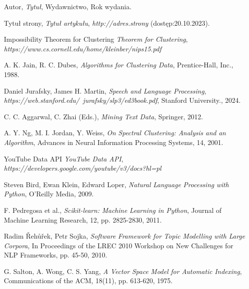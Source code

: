 \begin{thebibliography}{9}
\small


Autor, \emph{Tytuł}, Wydawnictwo, Rok wydania.

Tytuł strony, \emph{Tytuł artykułu}, \emph{http://adres.strony} (dostęp:20.10.2023).


Impossibility Theorem for Clustering
\emph{Theorem for Clustering}, \emph{https://www.cs.cornell.edu/home/kleinber/nips15.pdf}

A. K. Jain, R. C. Dubes, \emph{Algorithms for Clustering Data}, Prentice-Hall, Inc., 1988.

Daniel Jurafsky, James H. Martin, 
\emph{Speech and Language Processing}, \emph{https://web.stanford.edu/~jurafsky/slp3/ed3book.pdf},
Stanford University., 2024.

C. C. Aggarwal, C. Zhai (Eds.), \emph{Mining Text Data}, Springer, 2012.

A. Y. Ng, M. I. Jordan, Y. Weiss, \emph{On Spectral Clustering: Analysis and an Algorithm}, Advances in Neural Information Processing Systems, 14, 2001.


YouTube Data API \emph{YouTube Data API}, \emph{https://developers.google.com/youtube/v3/docs?hl=pl}

Steven Bird, Ewan Klein, Edward Loper, \emph{Natural Language Processing with Python}, O'Reilly Media, 2009.

F. Pedregosa et al., \emph{Scikit-learn: Machine Learning in Python}, Journal of Machine Learning Research, 12, pp. 2825-2830, 2011.

Radim Řehůřek, Petr Sojka, \emph{Software Framework for Topic Modelling with Large Corpora}, In Proceedings of the LREC 2010 Workshop on New Challenges for NLP Frameworks, pp. 45-50, 2010.

G. Salton, A. Wong, C. S. Yang, \emph{A Vector Space Model for Automatic Indexing}, Communications of the ACM, 18(11), pp. 613-620, 1975.


\end{thebibliography}
